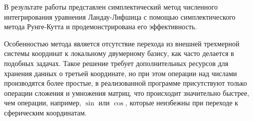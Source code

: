 
В результате работы представлен симплектический метод численного интегрирования
уравнения Ландау-Лифшица с помощью симплектического метода Рунге-Кутта и
продемонстрирована его эффективность.

Особенностью метода является отсутствие перехода из внешней трехмерной системы
координат к локальному двумерному базису, как часто делается в подобных
задачах. Такое решение требует дополнительных ресурсов для хранения данных о
третьей координате, но при этом операции над числами производятся более
простые, в реализованной программе присутствуют только операции сложения и
умножения матриц, что происходит значительно быстрее, чем операции, например,
$\sin$ или $\cos$, которые неизбежны при переходе к сферическим координатам.
